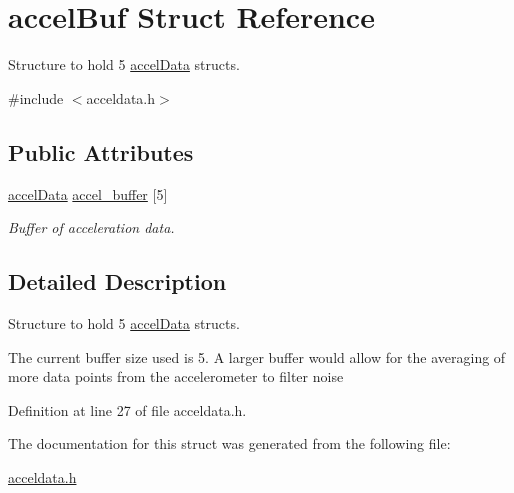 \hypertarget{structaccelBuf}{}\section{accel\+Buf Struct Reference}
\label{structaccelBuf}


Structure to hold 5 \hyperlink{structaccelData}{accel\+Data} structs.  




{\ttfamily \#include $<$acceldata.\+h$>$}

\subsection*{Public Attributes}
\begin{DoxyCompactItemize}
\item 
\hyperlink{structaccelData}{accel\+Data} \hyperlink{structaccelBuf_a72732f20c2c4ec8d7967580bcc1297a6}{accel\+\_\+buffer} \mbox{[}5\mbox{]}\hypertarget{structaccelBuf_a72732f20c2c4ec8d7967580bcc1297a6}{}\label{structaccelBuf_a72732f20c2c4ec8d7967580bcc1297a6}

\begin{DoxyCompactList}\small\item\em Buffer of acceleration data. \end{DoxyCompactList}\end{DoxyCompactItemize}


\subsection{Detailed Description}
Structure to hold 5 \hyperlink{structaccelData}{accel\+Data} structs. 

The current buffer size used is 5. A larger buffer would allow for the averaging of more data points from the accelerometer to filter noise 

Definition at line 27 of file acceldata.\+h.



The documentation for this struct was generated from the following file\+:\begin{DoxyCompactItemize}
\item 
\hyperlink{acceldata_8h}{acceldata.\+h}\end{DoxyCompactItemize}
